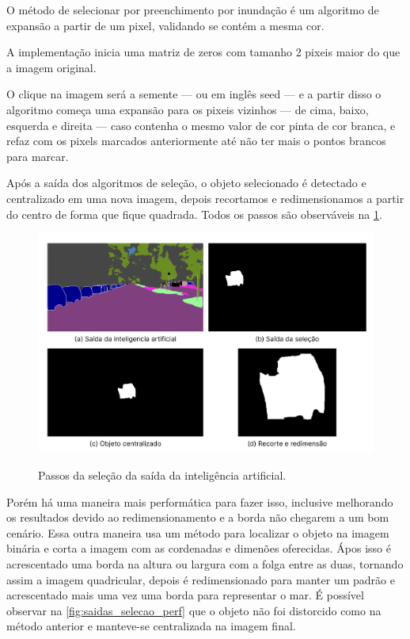 O método de  selecionar por preenchimento por inundação é um algoritmo de expansão a partir de um pixel, validando se contém a mesma cor.

A implementação inicia uma matriz de zeros com tamanho 2 pixeis maior do que a imagem original.

O clique na  imagem será a semente — ou em inglês  seed — e a partir disso o algoritmo começa uma expansão para os pixeis vizinhos — de cima, baixo, esquerda e direita — caso contenha o mesmo valor de cor pinta de cor branca, e refaz com os pixels marcados  anteriormente até não ter mais o pontos brancos para marcar.


Após a saída dos algoritmos de seleção, o objeto selecionado é detectado e centralizado em uma nova imagem, depois recortamos e redimensionamos a partir do centro de forma que fique quadrada. Todos os passos são observáveis na \cref{fig:saidas_selecao}.

\begin{figure}[!ht]
	\centering
    \caption{Passos da seleção da saída da inteligência  artificial.}
	\includegraphics[width=1.0\textwidth]{figures/saidas_selecao.png}
	\label{fig:saidas_selecao}
\end{figure}

Porém há uma maneira mais performática para fazer isso, inclusive melhorando os resultados devido ao redimensionamento e a borda não chegarem a um bom cenário. Essa outra maneira usa um método para localizar o objeto na imagem binária e corta a imagem com as cordenadas e dimenões oferecidas. Ápos isso é acrescentado uma borda na altura ou largura com a folga entre as duas, tornando assim a imagem quadricular, depois é redimensionado para manter um padrão e acrescentado mais uma vez uma borda para representar o mar. É possível observar na \cref{fig:saidas_selecao_perf} que o objeto não foi distorcido como na método anterior e manteve-se centralizada na imagem final.


